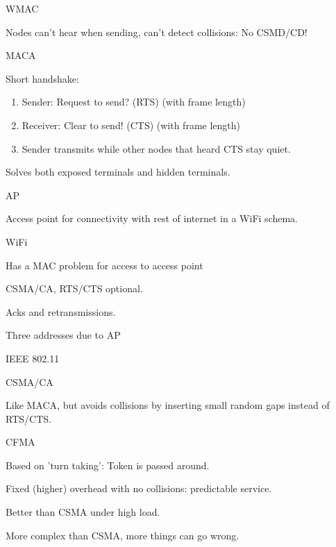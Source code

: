 \documentclass[main.tex]{subfiles}
\begin{document}
\begin{card}{WMAC}
\item Nodes can't hear when sending, can't detect collisions: No CSMD/CD!
\end{card}

\begin{card}{MACA}
\item Short handshake:
    \begin{enumerate}
        \item Sender: Request to send? (RTS) (with frame length)
        \item Receiver: Clear to send! (CTS) (with frame length)
        \item Sender transmits while other nodes that heard CTS stay quiet.
    \end{enumerate}
\item Solves both exposed terminals and hidden terminals.
\end{card}

\begin{card}{AP}
\item Access point for connectivity with rest of internet in a WiFi schema.
\end{card}

\full{}
\begin{card}{WiFi}
\item Has a MAC problem for access to access point
\item CSMA/CA, RTS/CTS optional.
\item Acks and retransmissions.
\item Three addresses due to AP
\item IEEE 802.11
\end{card}

\begin{card}{CSMA/CA}
\item Like MACA, but avoids collisions by inserting small random gaps instead of RTS/CTS.
\end{card}

\begin{card}{CFMA}
\item Based on 'turn taking': Token is passed around.
\item Fixed (higher) overhead with no collisions: predictable service.
\item Better than CSMA under high load.
\item More complex than CSMA, more things can go wrong.
\end{card}
\end{document}
